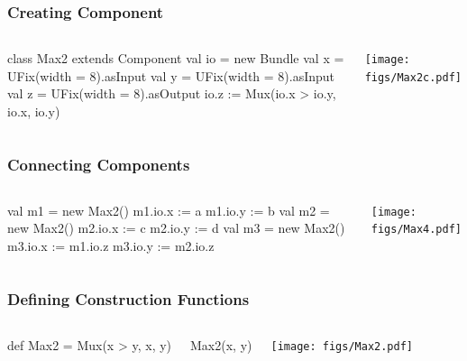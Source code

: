 \documentclass[xcolor=pdflatex,dvipsnames,table]{beamer}
\begin{document}
\begin{frame}[fragile]
\frametitle{Creating Component}

\begin{columns}

{
\begin{scala}
class Max2 extends Component {
  val io = new Bundle {
    val x = UFix(width = 8).asInput
    val y = UFix(width = 8).asInput
    val z = UFix(width = 8).asOutput }
  io.z := Mux(io.x > io.y, io.x, io.y)
}
\end{scala}
}

\begin{center}
\texttt{[image: figs/Max2c.pdf]} \\
\end{center}
\end{columns}

\end{frame}

\begin{frame}[fragile]
\frametitle{Connecting Components}

\begin{columns}
\begin{scala}
val m1 = new Max2()
m1.io.x := a
m1.io.y := b
val m2 = new Max2()
m2.io.x := c
m2.io.y := d
val m3 = new Max2()
m3.io.x := m1.io.z
m3.io.y := m2.io.z
\end{scala}


\begin{center}
\texttt{[image: figs/Max4.pdf]} \\
\end{center}
\end{columns}

\end{frame}


\begin{frame}[fragile]
\frametitle{Defining Construction Functions}

\begin{columns}


\begin{scala}
def Max2 = Mux(x > y, x, y)
\end{scala}
\begin{scala}
Max2(x, y)
\end{scala}


\begin{center}
\texttt{[image: figs/Max2.pdf]} \\[1cm]
\end{center}

\end{columns}

\end{frame}
\end{document}
